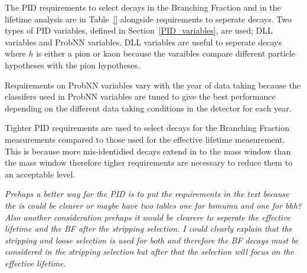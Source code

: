 The PID requirements to select \bmumu decays in the Branching Fraction and \bsmumu in the lifetime analysis are in Table~\ref{} alongside requirements to seperate \bhh decays. Two types of PID variables, defined in Section~\ref{PID_variables}, are used; DLL variables and ProbNN variables. DLL variables are useful to seperate \bhh decays where $h$ is either a pion or kaon because the varaibles compare different particle hypotheses with the pion hypotheses.

Requirements on ProbNN variables vary with the year of data taking because the classifers used in ProbNN variables are tuned to give the best performance depending on the different data taking conditions in the detector for each year. %

Tighter PID requirements are used to select \bmumu decays for the Branching Fraction measurements compared to those used for the effective lifetime measurement. This is because more mis-identidied decays extend in to the \bd mass window than the \bs mass window therefore tigher requirements are necessary to reduce them to an acceptable level. %

{\it Prehaps a better way for the PID is to put the requirements in the text because the is could be clearer or maybe have two tables one for bsmumu and one for bhh? Also another consideration prehaps it would be clearere to seperate the effective lifetime and the BF after the stripping selection. I could clearly explain that the stripping and loose selection is used for both and therefore the BF decays must be considered in the stripping selection but after that the selection will focus on the effective lifetime. }



